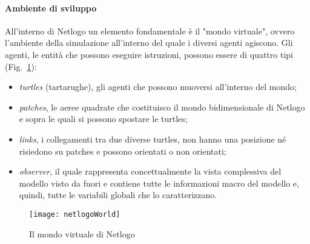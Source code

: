 \documentclass[12pt,a4paper,openright,twoside]{report}
\begin{document}
\paragraph{Ambiente di sviluppo}

All'interno di Netlogo un elemento fondamentale è il "mondo virtuale", ovvero l'ambiente della simulazione all'interno del quale i diversi agenti agiscono. Gli agenti, le entità che possono eseguire istruzioni, possono essere di quattro tipi (Fig.~\ref{netlogoWorld}): \begin{itemize}
\item \emph{turtles} (tartarughe), gli agenti che possono muoversi all'interno del mondo;
\item \emph{patches}, le aeree quadrate che costituisco il mondo bidimensionale di Netlogo e sopra le quali si possono spostare le turtles;
\item \emph{links}, i collegamenti tra due diverse turtles, non hanno una posizione né risiedono su patches e possono orientati o non orientati;
\item \emph{observer}, il quale rappresenta concettualmente la vista complessiva del modello visto da fuori e contiene tutte le informazioni macro del modello e, quindi, tutte le variabili globali che lo caratterizzano.
\end{itemize}

\begin{figure}[htb]
	\begin{center}
	\texttt{[image: netlogoWorld]}
	\end{center}
	\caption{Il mondo virtuale di Netlogo}
  	\label{netlogoWorld}
\end{figure}
\end{document}
